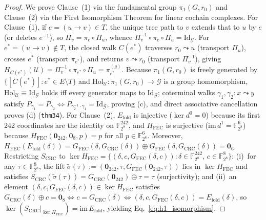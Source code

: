 \documentclass[11pt,letterpaper]{article}
\theoremstyle{spectralthm}
\begin{document}
\begin{proof}
We prove Clause~(1) via the fundamental group $\pi_1(G,r_0)$ and Clause~(2) via the First Isomorphism Theorem for linear cochain complexes. For Clause~(1), if $e = (u \to v) \in T$, the unique tree path to $v$ extends that to $u$ by $e$ (or deletes $e^{-1}$), so $\Pi_v = \pi_e \circ \Pi_u$, whence $\Pi_v^{-1} \circ \pi_e \circ \Pi_u = \mathrm{Id}_{\mathcal{G}}$. For $e^* = (u \to v) \notin T$, the closed walk $C(e^*)$ traverses $r_0 \leadsto u$ (transport $\Pi_u$), crosses $e^*$ (transport $\pi_{e^*}$), and returns $v \leadsto r_0$ (transport $\Pi_v^{-1}$), giving $H_{C(e^*)}(\mathcal{U}) = \Pi_v^{-1} \circ \pi_{e^*} \circ \Pi_u = \pi_{e^*}^{(g)}$. Because $\pi_1(G, r_0)$ is freely generated by $\{[C(e^*)] : e^* \in E \setminus T\}$ and $\mathrm{Hol}_{\mathcal{U}} : \pi_1(G, r_0) \to \mathcal{G}$ is a group homomorphism, $\mathrm{Hol}_{\mathcal{U}} \equiv \mathrm{Id}_{\mathcal{G}}$ holds iff every generator maps to $\mathrm{Id}_{\mathcal{G}}$; coterminal walks $\gamma_1, \gamma_2 : x \leadsto y$ satisfy $P_{\gamma_1} = P_{\gamma_2} \iff P_{\gamma_2^{-1}\cdot\gamma_1} = \mathrm{Id}_{\mathcal{G}}$, proving (c), and direct associative cancellation proves (d) (\texttt{thm34}). For Clause~(2), $E_{\mathrm{fold}}$ is injective ($\ker d^0 = 0$) because its first 242 coordinates are the identity on $\mathbb{F}_{2^8}^{242}$, and $H_{\mathrm{FEC}}$ is surjective ($\mathrm{im}\,d^1 = \mathbb{F}_{2^8}^6$) because $H_{\mathrm{FEC}}(\mathbf{0}_{242}, \mathbf{0}_8, p) = p$ for all $p \in \mathbb{F}_{2^8}^6$. Moreover, $H_{\mathrm{FEC}}(E_{\mathrm{fold}}(\delta)) = G_{\mathrm{FEC}}(\delta, G_{\mathrm{CRC}}(\delta)) \oplus G_{\mathrm{FEC}}(\delta, G_{\mathrm{CRC}}(\delta)) = \mathbf{0}_6$. Restricting $S_{\mathrm{CRC}}$ to $\ker H_{\mathrm{FEC}} = \{(\delta, c, G_{\mathrm{FEC}}(\delta, c)) : \delta \in \mathbb{F}_{2^8}^{242},\, c \in \mathbb{F}_{2^8}^8\}$: (i)~for any $\tau \in \mathbb{F}_{2^8}^8$, the lift $\tilde{\sigma}(\tau) := (\mathbf{0}_{242}, \tau, G_{\mathrm{FEC}}(\mathbf{0}_{242}, \tau))$ lies in $\ker H_{\mathrm{FEC}}$ and satisfies $S_{\mathrm{CRC}}(\tilde{\sigma}(\tau)) = G_{\mathrm{CRC}}(\mathbf{0}_{242}) \oplus \tau = \tau$ (surjectivity); and (ii)~an element $(\delta, c, G_{\mathrm{FEC}}(\delta, c)) \in \ker H_{\mathrm{FEC}}$ satisfies $G_{\mathrm{CRC}}(\delta) \oplus c = \mathbf{0}_8 \iff c = G_{\mathrm{CRC}}(\delta) \iff (\delta, c, G_{\mathrm{FEC}}(\delta, c)) = E_{\mathrm{fold}}(\delta)$, so $\ker(S_{\mathrm{CRC}}|_{\ker H_{\mathrm{FEC}}}) = \mathrm{im}\,E_{\mathrm{fold}}$, yielding Eq.~\eqref{eq:h1_isomorphism}.
\end{proof}
\end{document}

